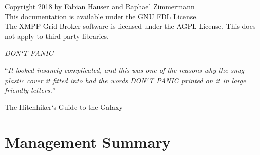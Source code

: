 \vspace*{\fill}

\noindent \textcopyright  Copyright 2018 by Fabian Hauser and Raphael Zimmermann\\

\noindent This documentation is available under the GNU FDL License. \\

\noindent The XMPP-Grid Broker software is licensed under the AGPL-License. This does not apply to third-party libraries.

\pagebreak


\vspace*{0.1\textheight}

{\noindent\huge\textit{DON`T PANIC}\par\vspace{10pt}}

\noindent\enquote{\itshape It looked insanely complicated, and this was one of the reasons why the snug plastic cover it fitted into had the words DON`T PANIC printed on it in large friendly letters.}\bigbreak

\hfill The Hitchhiker`s Guide to the Galaxy


\begin{abstract}
\addchaptertocentry{\abstractname} %
\end{abstract}


\chapter{Management Summary}
\addchaptertocentry{\abstractname} %

